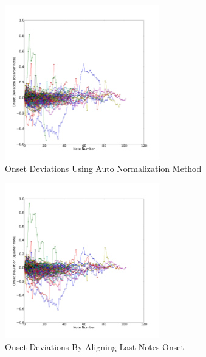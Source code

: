 \begin{figure}[tp]
   \begin{center}
      \includegraphics[width=0.6\textwidth]{fig/lian_onset_1}
   \end{center}
   \caption{Onset Deviations Using Auto Normalization Method}
   \label{fig:normauto}
\end{figure}

\begin{figure}[tp]
   \begin{center}
      \includegraphics[width=0.6\textwidth]{fig/lian_onset_2}
   \end{center}
   \caption{Onset Deviations By Aligning Last Notes Onset}
   \label{fig:norm1}
\end{figure}


